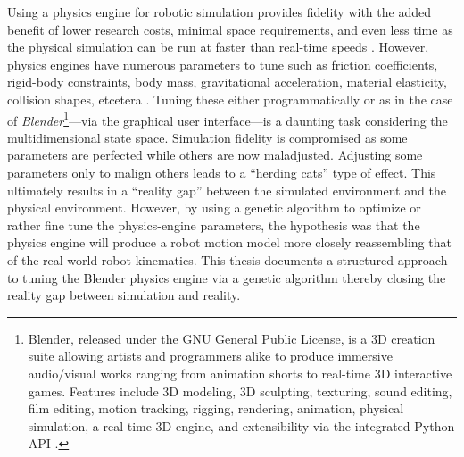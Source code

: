 \documentclass{book}[11pt]
\begin{document}
  Using a physics engine for robotic simulation provides fidelity with the added benefit of lower research costs, minimal space requirements, and even less time as the physical simulation can be run at faster than real-time speeds \cite{forklift}. However, physics engines have numerous parameters to tune such as friction coefficients, rigid-body constraints, body mass, gravitational acceleration, material elasticity, collision shapes, etcetera \cite{website:blender-rigidbody}\cite{website:blender-objecttype}. Tuning these either programmatically or as in the case of \textit{Blender}\footnote{Blender, released under the GNU General Public License, is a 3D creation suite allowing artists and programmers alike to produce immersive audio/visual works ranging from animation shorts to real-time 3D interactive games. Features include 3D modeling, 3D sculpting, texturing, sound editing, film editing, motion tracking, rigging, rendering, animation, physical simulation, a real-time 3D engine, and extensibility via the integrated Python API \cite{Hess:2007:EBG:1543288}.}---via the graphical user interface---is a daunting task considering the multidimensional state space. Simulation fidelity is compromised as some parameters are perfected while others are now maladjusted. Adjusting some parameters only to malign others leads to a ``herding cats'' type of effect. This ultimately results in a ``reality gap'' between the simulated environment and the physical environment. However, by using a genetic algorithm to optimize or rather fine tune the physics-engine parameters, the hypothesis was that the physics engine will produce a robot motion model more closely reassembling that of the real-world robot kinematics. This thesis documents a structured approach to tuning the Blender physics engine via a genetic algorithm thereby closing the reality gap between simulation and reality.  
  

  \tableofcontents
  

  \listoffigures
  
\end{document}
